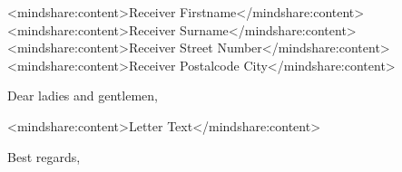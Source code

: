\documentclass[
fontsize=11pt,
paper=a4,
headsepline,
footsepline,
parskip=false
]{scrlttr2}
\begin{document}
\begin{letter}{%
<mindshare:content>Receiver Firstname</mindshare:content><mindshare:content>Receiver Surname</mindshare:content>\\ 
<mindshare:content>Receiver Street Number</mindshare:content>\\ 
<mindshare:content>Receiver Postalcode City</mindshare:content>
}

\opening{Dear ladies and gentlemen,}


<mindshare:content>Letter Text</mindshare:content>


\closing{Best regards,}






  
\end{letter}
\end{document}
